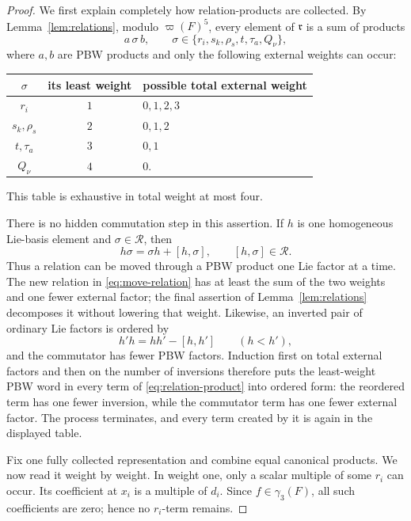 \documentclass[11pt]{amsart}
\theoremstyle{definition}
\theoremstyle{remark}
\newcommand{\gam}{\gamma}
\newcommand{\ww}{\varpi}
\begin{document}
\begin{proof}
We first explain completely how relation-products are collected.
By Lemma~\ref{lem:relations}, modulo \(\ww(F)^5\), every element of
\(\mathfrak r\) is a sum of products
\begin{equation}\label{eq:relation-product}
             a\,\sigma\,b,\qquad
 \sigma\in\{r_i,s_k,\rho_s,t,\tau_a,Q_\nu\},
\end{equation}
where \(a,b\) are PBW products and only the following external weights
can occur:
\begin{center}
\begin{tabular}{c|c|l}
\(\sigma\) & its least weight & possible total external weight\\ \hline
\(r_i\) & \(1\) & \(0,1,2,3\)\\
\(s_k,\rho_s\) & \(2\) & \(0,1,2\)\\
\(t,\tau_a\) & \(3\) & \(0,1\)\\
\(Q_\nu\) & \(4\) & \(0\).
\end{tabular}
\end{center}
This table is exhaustive in total weight at most four.

There is no hidden commutation step in this assertion.  If \(h\) is
one homogeneous Lie-basis element and \(\sigma\in\mathcal R\), then
\begin{equation}\label{eq:move-relation}
                    h\sigma=\sigma h+[h,\sigma],
 \qquad [h,\sigma]\in\mathcal R.
\end{equation}
Thus a relation can be moved through a PBW product one Lie factor at
a time.  The new relation in \eqref{eq:move-relation} has at least
the sum of the two weights and one fewer external factor; the final assertion of
Lemma~\ref{lem:relations} decomposes it without lowering that weight.
Likewise, an inverted pair of ordinary
Lie factors is ordered by
\begin{equation}\label{eq:pbw-swap}
                    h'h=hh'-[h,h']\qquad(h<h'),
\end{equation}
and the commutator has fewer PBW factors.  Induction first on total
external factors and then on the number of inversions therefore puts
the least-weight PBW word in every term of
\eqref{eq:relation-product} into ordered form:
the reordered term has one fewer inversion, while the commutator term
has one fewer external factor.  The process terminates, and every
term created by it is again in the displayed table.

Fix one fully collected representation and combine equal canonical
products.  We now read it weight by weight.  In weight one, only a scalar
multiple of some \(r_i\) can occur.  Its coefficient at \(x_i\) is a
multiple of \(d_i\).  Since \(f\in\gam_3(F)\), all such coefficients
are zero; hence no \(r_i\)-term remains.


\end{proof}
\end{document}
